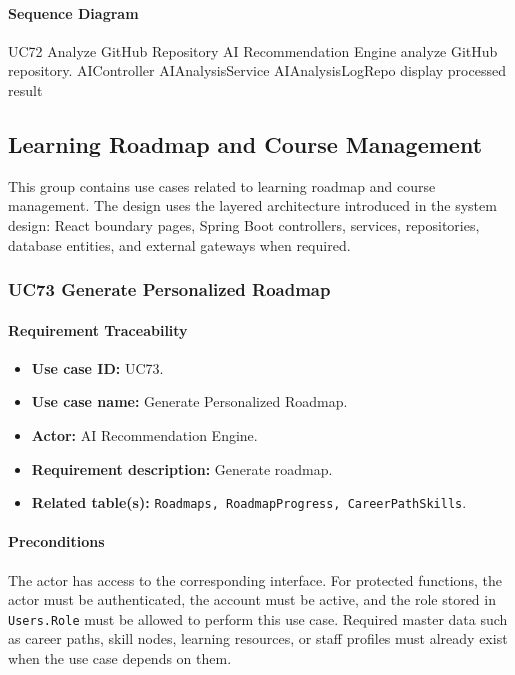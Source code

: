\paragraph{Sequence Diagram}

\SequenceDiagram
{UC72 Analyze GitHub Repository}
{AI Recommendation Engine}
{analyze GitHub repository.}
{AIController}
{AIAnalysisService}
{AIAnalysisLogRepo}
{display processed result}

\subsection{Learning Roadmap and Course Management}

This group contains use cases related to learning roadmap and course management. The design uses the layered architecture introduced in the system design: React boundary pages, Spring Boot controllers, services, repositories, database entities, and external gateways when required.

\subsubsection{UC73 Generate Personalized Roadmap}

\paragraph{Requirement Traceability}

\begin{itemize}
    \item \textbf{Use case ID:} UC73.
    \item \textbf{Use case name:} Generate Personalized Roadmap.
    \item \textbf{Actor:} AI Recommendation Engine.
    \item \textbf{Requirement description:} Generate roadmap.
    \item \textbf{Related table(s):} \texttt{Roadmaps, RoadmapProgress, CareerPathSkills}.
\end{itemize}

\paragraph{Preconditions}

The actor has access to the corresponding interface. For protected functions, the actor must be authenticated, the account must be active, and the role stored in \texttt{Users.Role} must be allowed to perform this use case. Required master data such as career paths, skill nodes, learning resources, or staff profiles must already exist when the use case depends on them.

